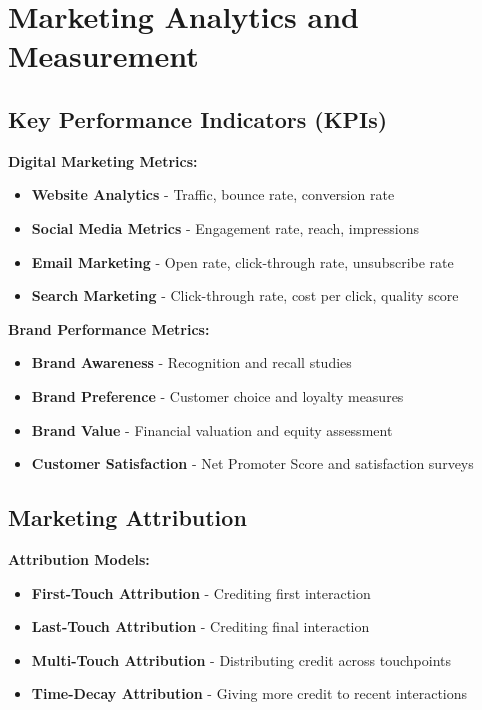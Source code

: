 \documentclass[12pt]{article}
\begin{document}
\section{Marketing Analytics and Measurement}

\subsection{Key Performance Indicators (KPIs)}

\textbf{Digital Marketing Metrics:}
\begin{itemize}
    \item \textbf{Website Analytics} - Traffic, bounce rate, conversion rate
    \item \textbf{Social Media Metrics} - Engagement rate, reach, impressions
    \item \textbf{Email Marketing} - Open rate, click-through rate, unsubscribe rate
    \item \textbf{Search Marketing} - Click-through rate, cost per click, quality score
\end{itemize}

\textbf{Brand Performance Metrics:}
\begin{itemize}
    \item \textbf{Brand Awareness} - Recognition and recall studies
    \item \textbf{Brand Preference} - Customer choice and loyalty measures
    \item \textbf{Brand Value} - Financial valuation and equity assessment
    \item \textbf{Customer Satisfaction} - Net Promoter Score and satisfaction surveys
\end{itemize}

\subsection{Marketing Attribution}

\textbf{Attribution Models:}
\begin{itemize}
    \item \textbf{First-Touch Attribution} - Crediting first interaction
    \item \textbf{Last-Touch Attribution} - Crediting final interaction
    \item \textbf{Multi-Touch Attribution} - Distributing credit across touchpoints
    \item \textbf{Time-Decay Attribution} - Giving more credit to recent interactions
\end{itemize}
\end{document}
